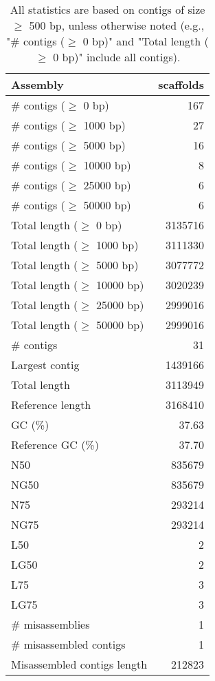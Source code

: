 \documentclass[12pt,a4paper]{article}
\begin{document}
\begin{table}[ht]
\begin{center}
\caption{All statistics are based on contigs of size $\geq$ 500 bp, unless otherwise noted (e.g., "\# contigs ($\geq$ 0 bp)" and "Total length ($\geq$ 0 bp)" include all contigs).}
\begin{tabular}{|l*{1}{|r}|}
\hline
Assembly & scaffolds \\ \hline
\# contigs ($\geq$ 0 bp) & 167 \\ \hline
\# contigs ($\geq$ 1000 bp) & 27 \\ \hline
\# contigs ($\geq$ 5000 bp) & 16 \\ \hline
\# contigs ($\geq$ 10000 bp) & 8 \\ \hline
\# contigs ($\geq$ 25000 bp) & 6 \\ \hline
\# contigs ($\geq$ 50000 bp) & 6 \\ \hline
Total length ($\geq$ 0 bp) & 3135716 \\ \hline
Total length ($\geq$ 1000 bp) & 3111330 \\ \hline
Total length ($\geq$ 5000 bp) & 3077772 \\ \hline
Total length ($\geq$ 10000 bp) & 3020239 \\ \hline
Total length ($\geq$ 25000 bp) & 2999016 \\ \hline
Total length ($\geq$ 50000 bp) & 2999016 \\ \hline
\# contigs & 31 \\ \hline
Largest contig & 1439166 \\ \hline
Total length & 3113949 \\ \hline
Reference length & 3168410 \\ \hline
GC (\%) & 37.63 \\ \hline
Reference GC (\%) & 37.70 \\ \hline
N50 & 835679 \\ \hline
NG50 & 835679 \\ \hline
N75 & 293214 \\ \hline
NG75 & 293214 \\ \hline
L50 & 2 \\ \hline
LG50 & 2 \\ \hline
L75 & 3 \\ \hline
LG75 & 3 \\ \hline
\# misassemblies & 1 \\ \hline
\# misassembled contigs & 1 \\ \hline
Misassembled contigs length & 212823 \\ \hline

\end{tabular}
\end{center}
\end{table}
\end{document}
